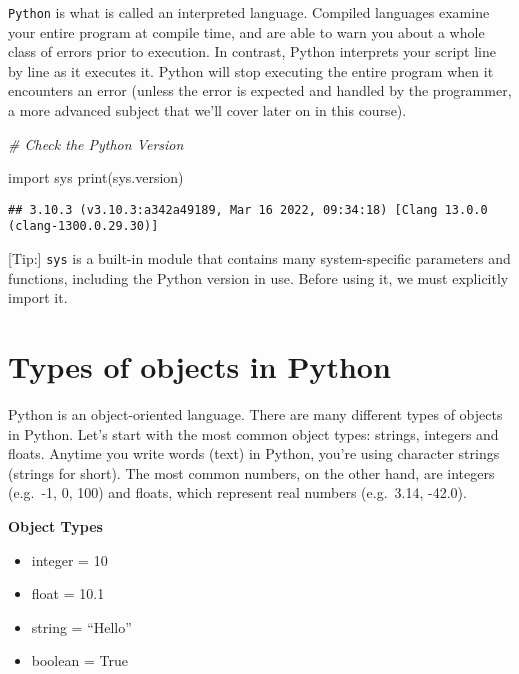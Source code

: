 \documentclass[
]{book}
\newenvironment{Shaded}{\begin{snugshade}}{\end{snugshade}}
\newcommand{\BuiltInTok}[1]{#1}
\newcommand{\CommentTok}[1]{\textcolor[rgb]{0.56,0.35,0.01}{\textit{#1}}}
\newcommand{\ImportTok}[1]{#1}
\newcommand{\NormalTok}[1]{#1}
\providecommand{\tightlist}{%
  \setlength{\itemsep}{0pt}\setlength{\parskip}{0pt}}
\begin{document}
\texttt{Python} is what is called an interpreted language. Compiled languages examine your entire program at compile time, and are able to warn you about a whole class of errors prior to execution. In contrast, Python interprets your script line by line as it executes it. Python will stop executing the entire program when it encounters an error (unless the error is expected and handled by the programmer, a more advanced subject that we'll cover later on in this course).

\begin{Shaded}
\begin{Highlighting}[]
\CommentTok{\# Check the Python Version}

\ImportTok{import}\NormalTok{ sys}
\BuiltInTok{print}\NormalTok{(sys.version)}
\end{Highlighting}
\end{Shaded}

\begin{verbatim}
## 3.10.3 (v3.10.3:a342a49189, Mar 16 2022, 09:34:18) [Clang 13.0.0 (clang-1300.0.29.30)]
\end{verbatim}

{[}Tip:{]} \texttt{sys} is a built-in module that contains many system-specific parameters and functions, including the Python version in use. Before using it, we must explicitly import it.

\hypertarget{types-of-objects-in-python}{%
\section{Types of objects in Python}\label{types-of-objects-in-python}}

Python is an object-oriented language. There are many different types of objects in Python. Let's start with the most common object types: strings, integers and floats. Anytime you write words (text) in Python, you're using character strings (strings for short). The most common numbers, on the other hand, are integers (e.g.~-1, 0, 100) and floats, which represent real numbers (e.g.~3.14, -42.0).

\textbf{Object Types}

\begin{itemize}
\tightlist
\item
  integer = 10
\item
  float = 10.1
\item
  string = ``Hello''
\item
  boolean = True
\end{itemize}
\end{document}
